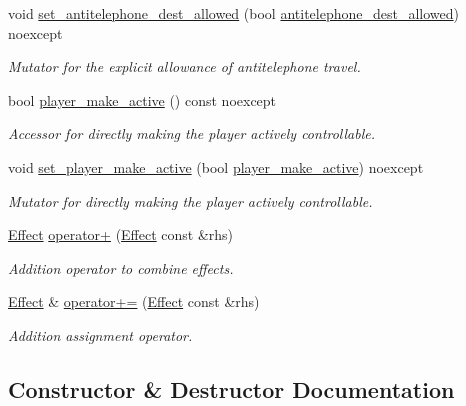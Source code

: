 \begin{DoxyCompactItemize}
void \hyperlink{classitem_1_1_effect_add9197b674f7ebd90c6a412d4a65e0e1}{set\+\_\+antitelephone\+\_\+dest\+\_\+allowed} (bool \hyperlink{classitem_1_1_effect_acb90e76e736868dd5307e8b6fe7e2e0d}{antitelephone\+\_\+dest\+\_\+allowed}) noexcept
\begin{DoxyCompactList}\small\item\em Mutator for the explicit allowance of antitelephone travel. \end{DoxyCompactList}\item 
bool \hyperlink{classitem_1_1_effect_a05de623b49c24c11fdb765c61c0367d0}{player\+\_\+make\+\_\+active} () const noexcept
\begin{DoxyCompactList}\small\item\em Accessor for directly making the player actively controllable. \end{DoxyCompactList}\item 
void \hyperlink{classitem_1_1_effect_aedb5619a40edeb90776d14691cdb80b1}{set\+\_\+player\+\_\+make\+\_\+active} (bool \hyperlink{classitem_1_1_effect_a05de623b49c24c11fdb765c61c0367d0}{player\+\_\+make\+\_\+active}) noexcept
\begin{DoxyCompactList}\small\item\em Mutator for directly making the player actively controllable. \end{DoxyCompactList}\item 
\hyperlink{classitem_1_1_effect}{Effect} \hyperlink{classitem_1_1_effect_a81c4b4c173683d278e1eae7e4ab8048a}{operator+} (\hyperlink{classitem_1_1_effect}{Effect} const \&rhs)
\begin{DoxyCompactList}\small\item\em Addition operator to combine effects. \end{DoxyCompactList}\item 
\hyperlink{classitem_1_1_effect}{Effect} \& \hyperlink{classitem_1_1_effect_af0d65e5a848289bfd28bfe980da51915}{operator+=} (\hyperlink{classitem_1_1_effect}{Effect} const \&rhs)
\begin{DoxyCompactList}\small\item\em Addition assignment operator. \end{DoxyCompactList}\end{DoxyCompactItemize}


\subsection{Constructor \& Destructor Documentation}
\mbox{\label{classitem_1_1_effect_a4260fb6ad9c8d3f63ca934fd4410d142}} 
